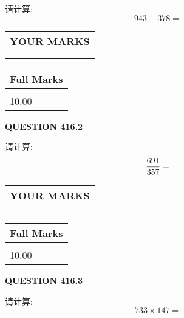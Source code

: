 \documentclass{ctexart}
\begin{document}
  
 
请计算:
\begin{equation}
943 -   %
378 = \nonumber
\end{equation}
 

 

 
  
\vspace{0.2in}
  
\noindent\begin{tabular}{|l|}
\hline
 YOUR MARKS  \\
\hline
 \\ 
 \\ 
\hline
\end{tabular}
\hspace{0.05in} \begin{tabular}{|l|}
\hline
 Full Marks  \\
\hline
 \\ 
10.00 \\
\hline
\end{tabular}
{\textbf{\Large{QUESTION
416.2 
}}}
  
  
 
请计算:
\begin{equation}
\frac { %
691 }  {  %
357} = \nonumber
\end{equation}
 

 

 
  
\vspace{0.2in}
  
\noindent\begin{tabular}{|l|}
\hline
 YOUR MARKS  \\
\hline
 \\ 
 \\ 
\hline
\end{tabular}
\hspace{0.05in} \begin{tabular}{|l|}
\hline
 Full Marks  \\
\hline
 \\ 
10.00 \\
\hline
\end{tabular}
{\textbf{\Large{QUESTION
416.3 
}}}
  
  
 
请计算:
\begin{equation}
733  \times    %
147 = \nonumber
\end{equation}
 

 
\end{document}
